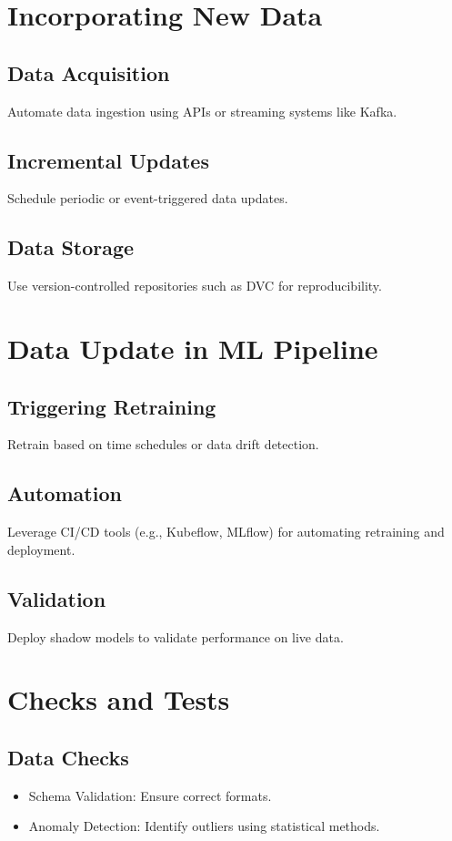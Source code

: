\section{Incorporating New Data}
\subsection{Data Acquisition}
Automate data ingestion using APIs or streaming systems like Kafka.

\subsection{Incremental Updates}
Schedule periodic or event-triggered data updates.

\subsection{Data Storage}
Use version-controlled repositories such as DVC for reproducibility.

\section{Data Update in ML Pipeline}
\subsection{Triggering Retraining}
Retrain based on time schedules or data drift detection.

\subsection{Automation}
Leverage CI/CD tools (e.g., Kubeflow, MLflow) for automating retraining and deployment.

\subsection{Validation}
Deploy shadow models to validate performance on live data.

\section{Checks and Tests}
\subsection{Data Checks}
\begin{itemize}
    \item Schema Validation: Ensure correct formats.
    \item Anomaly Detection: Identify outliers using statistical methods.
\end{itemize}

